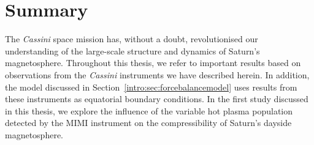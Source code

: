 \section{Summary}
The \textit{Cassini} space mission has, without a doubt, revolutionised our understanding of the large-scale structure and dynamics of Saturn's magnetosphere. Throughout this thesis, we refer to important results based on observations from the \textit{Cassini} instruments we have described herein. In addition, the \citet{achilleos2010a} model discussed in Section~\ref{intro:sec:forcebalancemodel} uses results from these instruments as equatorial boundary conditions. In the first study discussed in this thesis, we explore the influence of the variable hot plasma population detected by the MIMI instrument on the compressibility of Saturn's dayside magnetosphere.